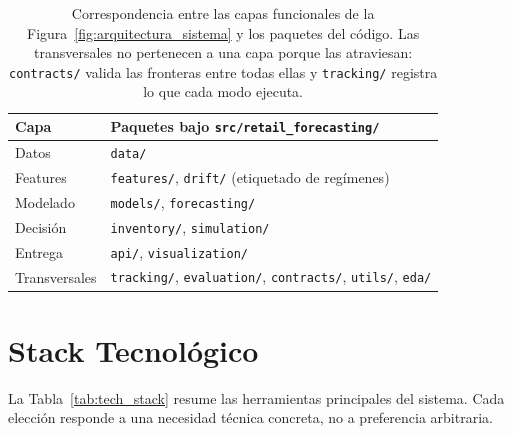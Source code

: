 \begin{table}[H]
    \centering
    \small
    \begin{tabular}{@{}ll@{}}
        \toprule
        \textbf{Capa} & \textbf{Paquetes bajo \texttt{src/retail\_forecasting/}} \\
        \midrule
        Datos & \texttt{data/} \\
        Features & \texttt{features/}, \texttt{drift/} (etiquetado de regímenes) \\
        Modelado & \texttt{models/}, \texttt{forecasting/} \\
        Decisión & \texttt{inventory/}, \texttt{simulation/} \\
        Entrega & \texttt{api/}, \texttt{visualization/} \\
        \midrule
        Transversales & \texttt{tracking/}, \texttt{evaluation/}, \texttt{contracts/}, \texttt{utils/}, \texttt{eda/} \\
        \bottomrule
    \end{tabular}
    \caption[Correspondencia entre capas funcionales y paquetes]{Correspondencia entre las capas funcionales de la Figura~\ref{fig:arquitectura_sistema} y los paquetes del código. Las transversales no pertenecen a una capa porque las atraviesan: \texttt{contracts/} valida las fronteras entre todas ellas y \texttt{tracking/} registra lo que cada modo ejecuta.}
    \label{tab:capas_paquetes}
\end{table}

\section{Stack Tecnológico}
\label{sec:stack}

La Tabla~\ref{tab:tech_stack} resume las herramientas principales del sistema. Cada elección responde a una necesidad técnica concreta, no a preferencia arbitraria.

